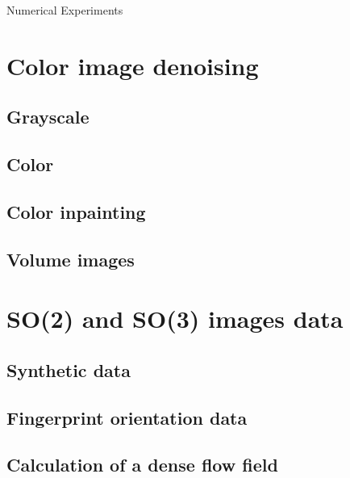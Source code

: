 \begin{chapter}{Numerical Experiments}
\label{ch:numericalexperiments}

\section{Color image denoising} %
\label{sec:Color image denoising}

\subsection{Grayscale} %
\label{sub:Grayscale}

\subsection{Color} %
\label{sub:Color}

\subsection{Color inpainting} %
\label{sub:Color inpainting}

\subsection{Volume images} %
\label{sub:Volume images}


\section{SO(2) and SO(3) images data} %
\label{sec:SO images data}

\subsection{Synthetic data} %
\label{sub:Synthetic data}

\subsection{Fingerprint orientation data} %
\label{sub:Fingerprint orientation data}

\subsection{Calculation of a dense flow field} %
\label{sub:Calculation of a dense flow field}


\end{chapter}
